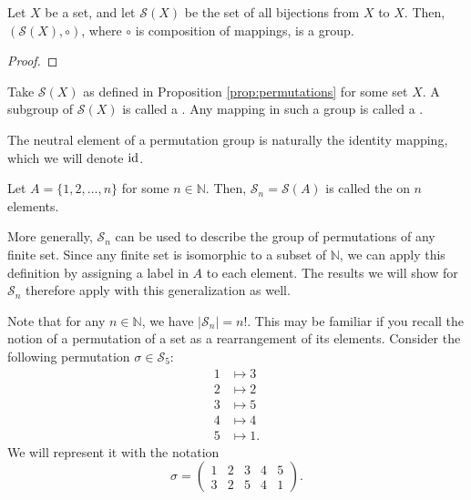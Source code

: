 \begin{prop}\label{prop:permutations}
Let $ X $ be a set, and let $ \mathcal{S}(X) $ be the set of all bijections from $ X $ to $ X $. Then, $ (\mathcal{S}(X),\circ) $, where $ \circ $ is composition of mappings, is a group.
\end{prop}
\begin{proof}
\end{proof}

\begin{defn}
Take $ \mathcal{S}(X) $ as defined in Proposition \ref{prop:permutations} for some set $ X $. A subgroup of $ \mathcal{S}(X) $ is called a . Any mapping in such a group is called a .
\end{defn}

The neutral element of a permutation group is naturally the identity mapping, which we will denote $ \operatorname{id} $.

\begin{defn}\label{defn:symmetric_group}
Let $ A=\{1,2,\ldots,n\} $ for some $ n\in\mathbb{N} $. Then, $ \mathcal{S}_n=\mathcal{S}(A) $ is called the  on $ n $ elements.
\end{defn}

More generally, $ \mathcal{S}_n $ can be used to describe the group of permutations of any finite set. Since any finite set is isomorphic to a subset of $ \mathbb{N} $, we can apply this definition by assigning a label in $ A $ to each element. The results we will show for $ \mathcal{S}_n $ therefore apply with this generalization as well.

Note that for any $ n\in\mathbb{N} $, we have $ \lvert\mathcal{S}_n\rvert=n! $. This may be familiar if you recall the notion of a permutation of a set as a rearrangement of its elements. Consider the following permutation $ \sigma\in\mathcal{S}_5 $:
\begin{align*}
    1 &\mapsto 3 \\
    2 &\mapsto 2 \\
    3 &\mapsto 5 \\
    4 &\mapsto 4 \\
    5 &\mapsto 1.
\end{align*}
We will represent it with the notation
\begin{equation*}
    \sigma=
    \begin{pmatrix}
        1 & 2 & 3 & 4 & 5 \\
        3 & 2 & 5 & 4 & 1
    \end{pmatrix}.
\end{equation*}


